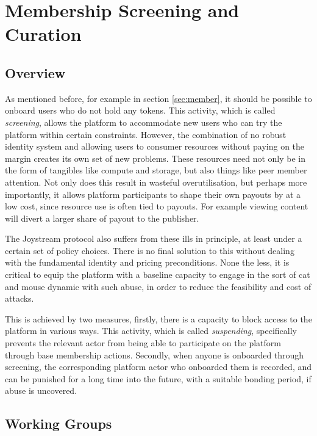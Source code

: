 \documentclass{article}
\begin{document}
\section{Membership Screening and Curation} \label{sec:membership_curation}

\subsection{Overview}

As mentioned before, for example in section \ref{sec:member}, it should be possible to onboard users who do not hold any tokens. This activity, which is called \textit{screening}, allows the platform to accommodate new users who can try the platform within certain constraints. However, the combination of no robust identity system and allowing users to consumer resources without paying on the margin creates its own set of new problems. These resources need not only be in the form of tangibles like compute and storage, but also things like peer member attention. Not only does this result in wasteful overutilisation, but perhaps more importantly, it allows platform participants to shape their own payouts by at a low cost, since resource use is often tied to payouts. For example viewing content will divert a larger share of payout to the publisher.

The Joystream protocol also suffers from these ills in principle, at least under a certain set of policy choices. There is no final solution to this without dealing with the fundamental identity and pricing preconditions. None the less, it is critical to equip the platform with a baseline capacity to engage in the sort of cat and mouse dynamic with such abuse, in order to reduce the feasibility and cost of attacks.

This is achieved by two measures, firstly, there is a capacity to block access to the platform in various ways. This activity, which is called \textit{suspending}, specifically prevents the relevant actor from being able to participate on the platform through base membership actions.
Secondly, when anyone is onboarded through screening, the corresponding platform actor who onboarded them is recorded, and can be punished for a long time into the future, with a suitable bonding period, if abuse is uncovered.

\subsection{Working Groups}
\end{document}

